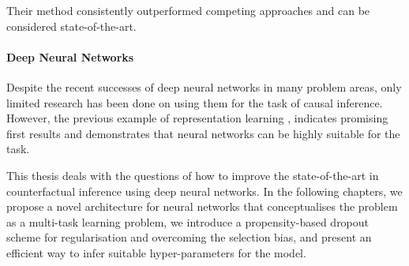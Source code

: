Their method consistently outperformed competing approaches and can be considered state-of-the-art. 


\paragraph{Deep Neural Networks} 
Despite the recent successes of deep neural networks in many problem areas, only limited research has been done on using them for the task of causal inference. However, the previous example of representation learning \cite{sontag-paper}, indicates promising first results and demonstrates that neural networks can be highly suitable for the task. 
 
This thesis deals with the questions of how to improve the state-of-the-art in counterfactual inference using deep neural networks. In the following chapters, we propose a novel architecture for neural networks that conceptualises the problem as a multi-task learning problem, we introduce a propensity-based dropout scheme for regularisation and overcoming the selection bias, and present an efficient way to infer suitable hyper-parameters for the model. 



